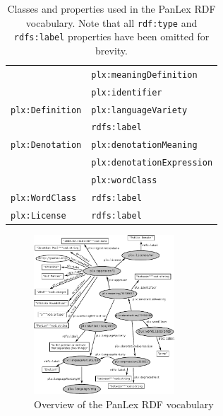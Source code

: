 \documentclass[sw]{iosart2c}
\begin{document}
\begin{table}
\begin{scriptsize}
\begin{tabular}{ll}
                      & \texttt{plx:meaningDefinition} \\
                      & \texttt{plx:identifier} \\
\midrule
\texttt{plx:Definition}
                      & \texttt{plx:languageVariety} \\
                      & \texttt{rdfs:label} \\
\midrule
\texttt{plx:Denotation}
                      & \texttt{plx:denotationMeaning} \\
                      & \texttt{plx:denotationExpression} \\
                      & \texttt{plx:wordClass} \\
\midrule
\texttt{plx:WordClass}  
                      & \texttt{rdfs:label} \\
\midrule
\texttt{plx:License}  & \texttt{rdfs:label} \\
\bottomrule
\end{tabular}
\end{scriptsize}
\caption{Classes and properties used in the PanLex RDF vocabulary. Note that all \texttt{\small rdf:type} and \texttt{\small rdfs:label} properties have been omitted for brevity.}
\label{tbl:vocabulary}
\end{table}

\begin{figure}
\includegraphics[width=0.47\textwidth]{images/pdf/ontology.pdf}
\caption{Overview of the PanLex RDF vocabulary}
\label{fig:vocabulary}
\end{figure}
\end{document}
